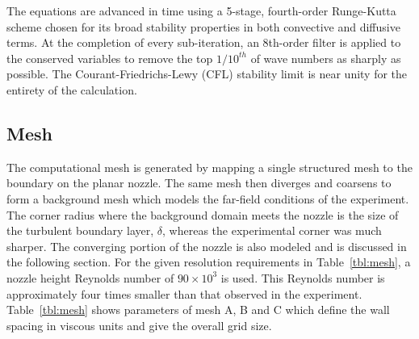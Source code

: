 \documentclass[]{aiaa-tc}%
\begin{document}
The equations are advanced in time using a 5-stage, fourth-order Runge-Kutta scheme\cite{Kennedy:00} chosen for its broad stability properties in both convective and diffusive terms.  At the completion of every sub-iteration, an 8th-order filter is applied to the conserved variables to remove the top $1/10^{th}$ of wave numbers as sharply as possible.  The Courant-Friedrichs-Lewy (CFL) stability limit is near unity for the entirety of the calculation.

\subsection{Mesh}

The computational mesh is generated by mapping a single structured mesh to the boundary on the planar nozzle.  The same mesh then diverges and coarsens to form a background mesh which models the far-field conditions of the experiment.  The corner radius where the background domain meets the nozzle is the size of the turbulent boundary layer, $\delta$, whereas the experimental corner was much sharper.  The converging portion of the nozzle is also modeled and is discussed in the following section.   
For the given resolution requirements in Table~\ref{tbl:mesh}, a nozzle height Reynolds number of $90\times 10^3$ is used.  This Reynolds number is approximately four times smaller than that observed in the experiment.  Table~\ref{tbl:mesh} shows parameters of mesh A, B and C which define the wall spacing in viscous units and give the overall grid size.  
\end{document}
